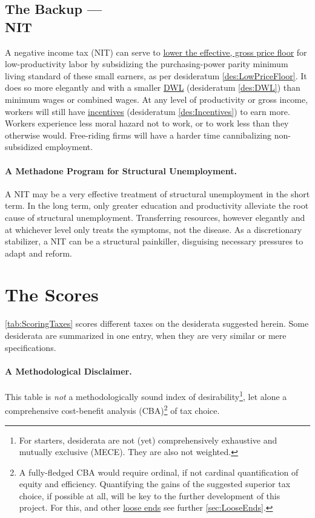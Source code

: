 \subsection[Negative Income Tax]{The Backup ---\\NIT} \label{sec:ScoreNIT} A negative income tax (NIT) can serve to \hyperref[des:LowPriceFloor]{lower the effective, gross price floor} for low-productivity labor by subsidizing the purchasing-power parity minimum living standard of these small earners, as per desideratum \ref{des:LowPriceFloor}. It does so more elegantly and with a smaller \hyperref[des:DWL]{DWL} (desideratum \ref{des:DWL}) than minimum wages or combined wages. At any level of productivity or gross income, workers will still have \hyperref[des:Incentives]{incentives} (desideratum \ref{des:Incentives}) to earn more. Workers experience less moral hazard not to work, or to work less than they otherwise would. Free-riding firms will have a harder time cannibalizing non-subsidized employment. 

\paragraph{A Methadone Program for Structural Unemployment.} A NIT may be a very effective treatment of structural unemployment in the short term. In the long term, only greater education and productivity alleviate the root cause of structural unemployment. Transferring resources, however elegantly and at whichever level only treats the symptoms, not the disease. As a discretionary stabilizer, a NIT can be a structural painkiller, disguising necessary pressures to adapt and reform. 
\clearpage

\section{The Scores} \label{sec:Scores}

\autoref{tab:ScoringTaxes} scores different taxes on the desiderata suggested herein. Some desiderata are summarized in one entry, when they are very similar or mere specifications.

\paragraph{A Methodological Disclaimer.} This table is \emph{not} a methodologically sound index of desirability\footnote{For starters, desiderata are not (yet) comprehensively exhaustive and mutually exclusive (MECE). They are also not weighted.}, let alone a comprehensive cost-benefit analysis (CBA)\footnote{
	A fully-fledged CBA would require ordinal, if not cardinal quantification of equity and efficiency. Quantifying the gains of the suggested superior tax choice, if possible at all, will be key to the further development of this project. For this, and other \hyperref[sec:LooseEnds]{loose ends} see further \autoref{sec:LooseEnds}.} 
of tax choice.

